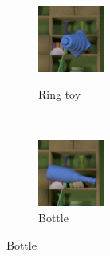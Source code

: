 \documentclass{jov}
\begin{document}
\begin{figure}
\begin{subfigure}[b]{0.14 \textwidth}
        \label{fig:libraryWithBarrel}
         \end{subfigure}
    ~
	\begin{subfigure}[b]{0.14 \textwidth}
        \caption{Ring toy}
        \includegraphics[width=\textwidth]{../FiguresDraft4/Figure4/Figure4_e.png}
        \label{fig:libraryWithRingToy}
    \end{subfigure}
        ~
    	\begin{subfigure}[b]{0.14 \textwidth}
        \caption{Bottle}
        \includegraphics[width=\textwidth]{../FiguresDraft4/Figure4/Figure4_f.png}

\end{subfigure}
\end{figure}
\end{document}
